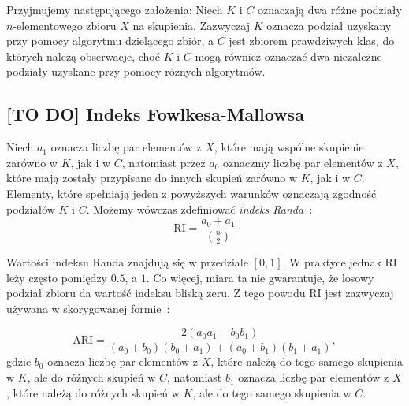 \documentclass{praca1}
\begin{document}
Przyjmujemy następującego założenia: Niech $K$ i $C$ oznaczają dwa różne podziały $n$-elementowego zbioru $X$ na skupienia. Zazwyczaj $K$ oznacza podział uzyskany przy pomocy algorytmu dzielącego zbiór, a $C$ jest zbiorem prawdziwych klas, do których należą obserwacje, choć $K$ i $C$ mogą również oznaczać dwa niezależne podziały uzyskane przy pomocy różnych algorytmów.

\subsection{[TO DO] Indeks Fowlkesa-Mallowsa}

Niech $a_1$ oznacza liczbę par elementów z $X$, które mają wspólne skupienie zarówno w $K$, jak i w $C$, natomiast przez $a_0$ oznaczmy liczbę par elementów z $X$, które mają zostały przypisane do innych skupień zarówno w $K$, jak i w $C$. Elementy, które spełniają jeden z powyższych warunków oznaczają zgodność podziałów $K$ i $C$. Możemy wówczas zdefiniować \emph{indeks Randa}~\cite{Rand1971:objective}:
\begin{equation}
\textrm{RI} = \frac{a_0+a_1}{{n \choose 2} }
\end{equation}

Wartości indeksu Randa znajdują się w przedziale $[0,1]$. W praktyce jednak $\textrm{RI}$ leży często pomiędzy $0.5$, a $1$. Co więcej, miara ta nie gwarantuje, że losowy podział zbioru da wartość indeksu bliską zeru. Z tego powodu $\textrm{RI}$ jest zazwyczaj używana w skorygowanej formie~\cite{Lawrence1985:comparing}:

\begin{equation}
\textrm{ARI} = \frac{2 (a_0 a_1 - b_0 b_1) }{(a_0 + b_0)(b_0 + a_1) + (a_0 + b_1)(b_1 + a_1)},
\end{equation}
gdzie $b_0$ oznacza liczbę par elementów z $X$, które należą do tego samego skupienia w $K$, ale do różnych skupień w $C$, natomiast $b_1$ oznacza liczbę par elementów z $X$, które należą do różnych skupień w $K$, ale do tego samego skupienia w $C$.



\end{document}
